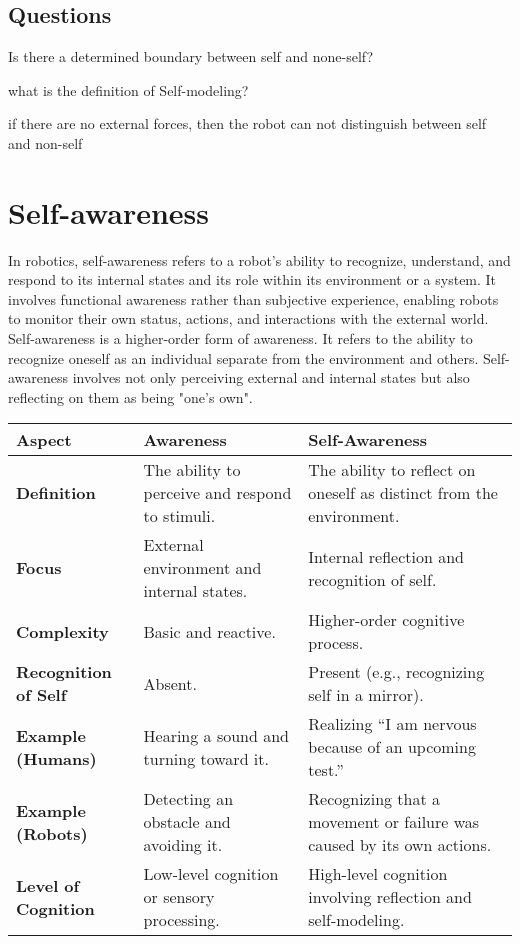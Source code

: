 \subsection{Questions}
Is there a determined boundary between self and none-self?

what is the definition of Self-modeling?

if there are no external forces, then the robot can not distinguish between self and non-self
    
    
    
\section{Self-awareness}
In robotics, self-awareness refers to a robot's ability to recognize, understand, and respond to its internal states and its role within its environment or a system. It involves functional awareness rather than subjective experience, enabling robots to monitor their own status, actions, and interactions with the external world. Self-awareness is a higher-order form of awareness. It refers to the ability to recognize oneself as an individual separate from the environment and others. Self-awareness involves not only perceiving external and internal states but also reflecting on them as being "one's own".
    \begin{tabular}{|l|l|l|}
        \hline
        \textbf{Aspect}             & \textbf{Awareness}                              & \textbf{Self-Awareness}                          \\ \hline
        \textbf{Definition}         & The ability to perceive and respond to stimuli. & The ability to reflect on oneself as distinct from the environment. \\ \hline
        \textbf{Focus}              & External environment and internal states.       & Internal reflection and recognition of self.    \\ \hline
        \textbf{Complexity}         & Basic and reactive.                             & Higher-order cognitive process.                 \\ \hline
        \textbf{Recognition of Self}& Absent.                                         & Present (e.g., recognizing self in a mirror).   \\ \hline
        \textbf{Example (Humans)}   & Hearing a sound and turning toward it.          & Realizing “I am nervous because of an upcoming test.” \\ \hline
        \textbf{Example (Robots)}   & Detecting an obstacle and avoiding it.          & Recognizing that a movement or failure was caused by its own actions. \\ \hline
        \textbf{Level of Cognition} & Low-level cognition or sensory processing.      & High-level cognition involving reflection and self-modeling. \\ \hline  
    \end{tabular}
